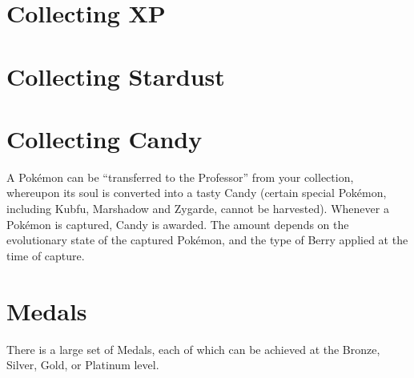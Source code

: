 \section{Collecting XP}

\section{Collecting Stardust}

\section{Collecting Candy}
A Pokémon can be ``transferred to the Professor'' from your collection,
 whereupon its soul is converted into a tasty Candy (certain special
 Pokémon, including Kubfu, Marshadow and Zygarde, cannot be harvested).
Whenever a Pokémon is captured, Candy is awarded. The amount depends on
 the evolutionary state of the captured Pokémon, and the type of Berry
 applied at the time of capture.

\section{Medals}
There is a large set of Medals, each of which can be achieved at the Bronze,
 Silver, Gold, or Platinum level.

